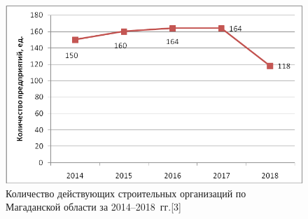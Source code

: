 \begin{figure}[h!]

  \begin{center}
    \includegraphics[width=1\textwidth]{authors/serebryakova-fig-1.png}
  \end{center}

  \caption{Количество действующих строительных организаций по Магаданской
области за 2014--2018~гг.[3]}
  \label{fig:serebryakova-fig-1}
\end{figure}
